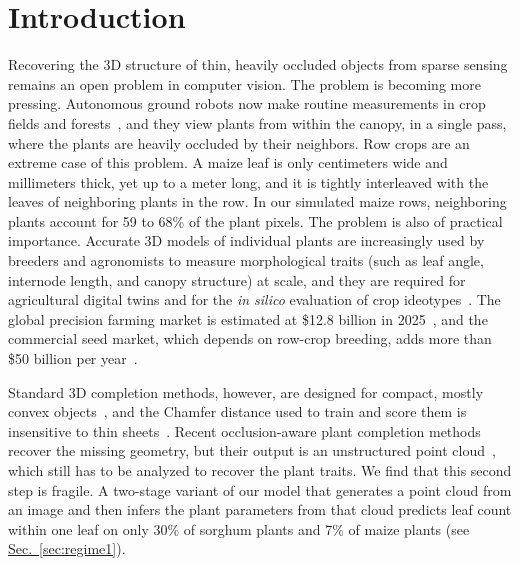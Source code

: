 \documentclass[10pt,twocolumn,letterpaper]{article}
\newcommand{\secref}[1]{\hyperref[#1]{Sec.~\ref*{#1}}}
\begin{document}
\section{Introduction}
\label{sec:intro}

Recovering the 3D structure of thin, heavily occluded objects from sparse sensing remains an open problem in computer vision. The problem is becoming more pressing. Autonomous ground robots now make routine measurements in crop fields and forests~\citep{kayacan2018terrasentia,muellersim2017robotanist,xu2022groundrobots,mattamala2024forest}, and they view plants from within the canopy, in a single pass, where the plants are heavily occluded by their neighbors. Row crops are an extreme case of this problem. A maize leaf is only centimeters wide and millimeters thick, yet up to a meter long, and it is tightly interleaved with the leaves of neighboring plants in the row. In our simulated maize rows, neighboring plants account for 59 to 68\% of the plant pixels. The problem is also of practical importance. Accurate 3D models of individual plants are increasingly used by breeders and agronomists to measure morphological traits (such as leaf angle, internode length, and canopy structure) at scale, and they are required for agricultural digital twins and for the \emph{in silico} evaluation of crop ideotypes~\citep{pylianidis2021digitaltwins,verdouw2021digitaltwins,soualiou2021fspm,hadadi2025procmaize, maizefield3d2025}. The global precision farming market is estimated at \$12.8 billion in 2025~\citep{bcc2025precisionfarming}, and the commercial seed market, which depends on row-crop breeding, adds more than \$50 billion per year~\citep{mordor2026seed}.


Standard 3D completion methods, however, are designed for compact, mostly convex objects~\citep{yuan2018pcn,yu2021pointr}, and the Chamfer distance used to train and score them is insensitive to thin sheets~\citep{wu2021dcd, song2026structural}. Recent occlusion-aware plant completion methods recover the missing geometry, but their output is an unstructured point cloud~\citep{lee2026occ}, which still has to be analyzed to recover the plant traits. We find that this second step is fragile. A two-stage variant of our model that generates a point cloud from an image and then infers the plant parameters from that cloud predicts leaf count within one leaf on only 30\% of sorghum plants and 7\% of maize plants (see \secref{sec:regime1}).
\end{document}
